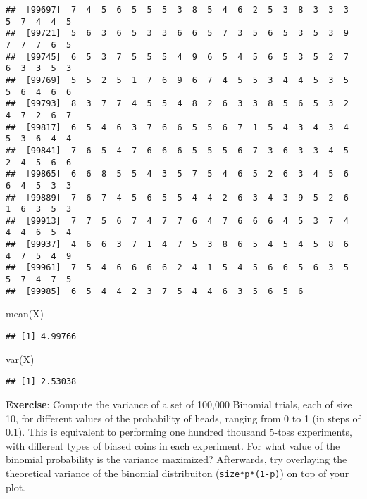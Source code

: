 \documentclass[
]{book}
\newenvironment{Shaded}{\begin{snugshade}}{\end{snugshade}}
\newcommand{\FunctionTok}[1]{\textcolor[rgb]{0.00,0.00,0.00}{#1}}
\newcommand{\NormalTok}[1]{#1}
\begin{document}
\begin{verbatim}
##  [99697]  7  4  5  6  5  5  5  3  8  5  4  6  2  5  3  8  3  3  3  5  7  4  4  5
##  [99721]  5  6  3  6  5  3  3  6  6  5  7  3  5  6  5  3  5  3  9  7  7  7  6  5
##  [99745]  6  5  3  7  5  5  5  4  9  6  5  4  5  6  5  3  5  2  7  6  3  3  5  3
##  [99769]  5  5  2  5  1  7  6  9  6  7  4  5  5  3  4  4  5  3  5  5  6  4  6  6
##  [99793]  8  3  7  7  4  5  5  4  8  2  6  3  3  8  5  6  5  3  2  4  7  2  6  7
##  [99817]  6  5  4  6  3  7  6  6  5  5  6  7  1  5  4  3  4  3  4  5  3  6  4  4
##  [99841]  7  6  5  4  7  6  6  6  5  5  5  6  7  3  6  3  3  4  5  2  4  5  6  6
##  [99865]  6  6  8  5  5  4  3  5  7  5  4  6  5  2  6  3  4  5  6  6  4  5  3  3
##  [99889]  7  6  7  4  5  6  5  5  4  4  2  6  3  4  3  9  5  2  6  1  6  3  5  3
##  [99913]  7  7  5  6  7  4  7  7  6  4  7  6  6  6  4  5  3  7  4  4  4  6  5  4
##  [99937]  4  6  6  3  7  1  4  7  5  3  8  6  5  4  5  4  5  8  6  4  7  5  4  9
##  [99961]  7  5  4  6  6  6  6  2  4  1  5  4  5  6  6  5  6  3  5  5  7  4  7  5
##  [99985]  6  5  4  4  2  3  7  5  4  4  6  3  5  6  5  6
\end{verbatim}

\begin{Shaded}
\begin{Highlighting}[]
\FunctionTok{mean}\NormalTok{(X)}
\end{Highlighting}
\end{Shaded}

\begin{verbatim}
## [1] 4.99766
\end{verbatim}

\begin{Shaded}
\begin{Highlighting}[]
\FunctionTok{var}\NormalTok{(X)}
\end{Highlighting}
\end{Shaded}

\begin{verbatim}
## [1] 2.53038
\end{verbatim}

\textbf{Exercise}: Compute the variance of a set of 100,000 Binomial trials, each of size 10, for different values of the probability of heads, ranging from 0 to 1 (in steps of 0.1). This is equivalent to performing one hundred thousand 5-toss experiments, with different types of biased coins in each experiment. For what value of the binomial probability is the variance maximized? Afterwards, try overlaying the theoretical variance of the binomial distribuiton (\texttt{size*p*(1-p)}) on top of your plot.
\end{document}
